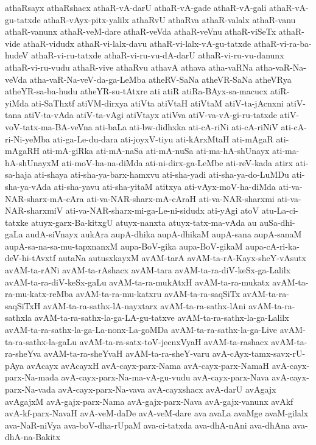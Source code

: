 {athaRsayx
athaRshacx
athaR-vA-darU
athaR-vA-gade
athaR-vA-gali
athaR-vA-gu-tatxde
athaR-vAyx-pitx-yalilx
athaRvU
athaRva
athaR-valalx
athaR-vanu
athaR-vanunx
athaR-veM-dare
athaR-veVda
athaR-veVnu
athaR-viSeTx
athaR-vide
athaR-vidudx
athaR-vi-lalx-davu
athaR-vi-lalx-vA-gu-tatxde
athaR-vi-ra-ba-hudeV
athaR-vi-ru-tatxde
athaR-vi-ru-vu-dA-darU
athaR-vi-ru-vu-danunx
athaR-vi-ru-vudu
athaR-vive
athaRvu
athavA
athava
atha-vaRNa
atha-vaR-Na-veVda
atha-vaR-Na-veV-da-ga-LeMba
atheRV-SaNa
atheVR-SaNa
atheVRya
atheYR-sa-ba-hudu
atheYR-su-tAtxre
ati
atiR
atiRa-BAyx-sa-macucx
atiR-yiMda
ati-SaThxtf
atiVM-dirxya
atiVta
atiVtaH
atiVtaM
atiV-ta-jAcnxni
atiV-tana
atiV-ta-vAda
atiV-ta-vAgi
atiVtayx
atiVva
atiV-va-vA-gi-ru-tatxde
atiV-voV-tatx-ma-BA-veVna
ati-baLa
ati-bw-didhxka
ati-cA-riNi
ati-cA-riNiV
ati-cA-ri-Ni-yeMba
ati-ga-Le-du-dara
ati-joyxV-tiyu
ati-kArxMtaH
ati-mAgaR
ati-mAgaRH
ati-mA-giRka
ati-mA-naSa
ati-mA-nuSa
ati-ma-hA-shUnayx
ati-ma-hA-shUnayxM
ati-moV-ha-na-diMda
ati-ni-dirx-ga-LeMbe
ati-reV-kada
atirx
ati-sa-haja
ati-shaya
ati-sha-ya-barx-hamxvu
ati-sha-yadi
ati-sha-ya-do-LuMDu
ati-sha-ya-vAda
ati-sha-yavu
ati-sha-yitaM
atitxya
ati-vAyx-moV-ha-diMda
ati-va-NAR-sharx-mA-cAra
ati-va-NAR-sharx-mA-cAraH
ati-va-NAR-sharxmi
ati-va-NAR-sharxmiV
ati-va-NAR-sharx-mi-ga-Le-ni-sidudx
ati-yAgi
atoV
atu-La-ci-tatxke
atuyx-garx-Ba-kitxgU
atuyx-nanxta
atuyx-tatx-ma-vAda
au
auSa-dhi-gaLa
audA-siVnayx
aukAra
aupA-dhika
aupA-dhikaM
aupA-sana
aupA-sanaM
aupA-sa-na-sa-mu-tapxnanxM
aupa-BoV-gika
aupa-BoV-gikaM
aupa-cA-ri-ka-deV-hi-tAvxtf
autaNa
autusxkayxM
avAM-tarA
avAM-ta-rA-Kayx-sheY-vAsutx
avAM-ta-rANi
avAM-ta-rAshacx
avAM-tara
avAM-ta-ra-diV-keSx-ga-Lalilx
avAM-ta-ra-diV-keSx-gaLu
avAM-ta-ra-mukAtxH
avAM-ta-ra-mukatx
avAM-ta-ra-mu-katx-reMba
avAM-ta-ra-mu-katxru
avAM-ta-ra-saqSiTx
avAM-ta-ra-saqSiTxH
avAM-ta-ra-sathx-lA-nayxtarx
avAM-ta-ra-sathx-lAni
avAM-ta-ra-sathxla
avAM-ta-ra-sathx-la-ga-LA-gu-tatxve
avAM-ta-ra-sathx-la-ga-Lalilx
avAM-ta-ra-sathx-la-ga-La-nonx-La-goMDa
avAM-ta-ra-sathx-la-ga-Live
avAM-ta-ra-sathx-la-gaLu
avAM-ta-ra-satx-toV-jecnxVyaH
avAM-ta-rashacx
avAM-ta-ra-sheYva
avAM-ta-ra-sheYvaH
avAM-ta-ra-sheY-varu
avA-cAyx-tamx-savx-rU-pAya
avAcayx
avAcayxH
avA-cayx-parx-Nama
avA-cayx-parx-NamaH
avA-cayx-parx-Na-mada
avA-cayx-parx-Na-ma-vA-gu-vudu
avA-cayx-parx-Nava
avA-cayx-parx-Na-vada
avA-cayx-parx-Na-vava
avA-cayxshacx
avA-darU
avAgajx
avAgajxM
avA-gajx-parx-Nama
avA-gajx-parx-Nava
avA-gajx-vanunx
avAkf
avA-kf-parx-NavaH
avA-veM-daDe
avA-veM-dare
ava
avaLa
avaMge
avaM-gilalx
ava-NaR-niVya
ava-boV-dha-rUpaM
ava-ci-tatxda
ava-dhA-nAni
ava-dhAna
ava-dhA-na-Bakitx
}
